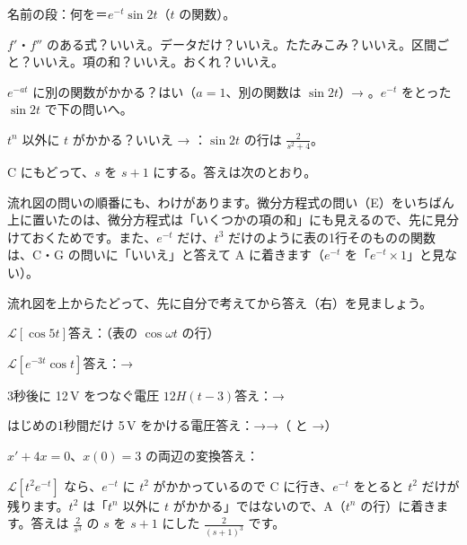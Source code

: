 \begin{enumerate}[label={\bkcircled[\bkTT]{\arabic*}}, leftmargin=2.4\zw, itemsep=1pt, topsep=2pt]
\item 名前の段：何を＝$e^{-t}\sin2t$（$t$ の関数）。
\item $f'$・$f''$ のある式？\enspace いいえ。\enspace データだけ？\enspace いいえ。\enspace たたみこみ？\enspace いいえ。\enspace 区間ごと？\enspace いいえ。\enspace 項の和？\enspace いいえ。\enspace おくれ？\enspace いいえ。
\item $e^{-at}$ に別の関数がかかる？\enspace はい（$a=1$、別の関数は $\sin2t$）→ 。$e^{-t}$ をとった $\sin2t$ で下の問いへ。
\item $t^n$ 以外に $t$ がかかる？\enspace いいえ → ：$\sin2t$ の行は $\frac{2}{s^2+4}$。
\item C にもどって、$s$ を $s+1$ にする。答えは次のとおり。
\end{enumerate}
流れ図の問いの順番にも、わけがあります。微分方程式の問い（E）をいちばん上に置いたのは、微分方程式は「いくつかの項の和」にも見えるので、先に見分けておくためです。また、$e^{-t}$ だけ、$t^3$ だけのように表の1行そのものの関数は、C・G の問いに「いいえ」と答えて A に着きます（$e^{-t}$ を「$e^{-t}\times1$」と見ない）。

流れ図を上からたどって、先に自分で考えてから答え（右）を見ましょう。
\begin{enumerate}[label={\bkcircled[\bkTT]{\arabic*}}, leftmargin=2.4\zw, itemsep=2pt, topsep=2pt]
\item $\mathcal L[\cos5t]$\hfill 答え：（表の $\cos\omega t$ の行）
\item $\mathcal L[e^{-3t}\cos t]$\hfill 答え：→
\item 3秒後に 12\,V をつなぐ電圧 $12H(t-3)$\hfill 答え：→
\item はじめの1秒間だけ 5\,V をかける電圧\hfill 答え：→→（ と →）
\item $x'+4x=0$、$x(0)=3$ の両辺の変換\hfill 答え：
\end{enumerate}
$\mathcal L[t^2e^{-t}]$ なら、$e^{-t}$ に $t^2$ がかかっているので C に行き、$e^{-t}$ をとると $t^2$ だけが残ります。$t^2$ は「$t^n$ 以外に $t$ がかかる」ではないので、A（$t^n$ の行）に着きます。答えは $\frac{2}{s^3}$ の $s$ を $s+1$ にした $\frac{2}{(s+1)^3}$ です。



